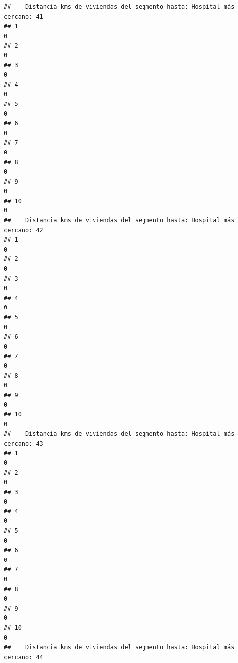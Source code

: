 \documentclass[11pt,]{article}
\begin{document}
\begin{verbatim}
##    Distancia kms de viviendas del segmento hasta: Hospital más cercano: 41
## 1                                                                        0
## 2                                                                        0
## 3                                                                        0
## 4                                                                        0
## 5                                                                        0
## 6                                                                        0
## 7                                                                        0
## 8                                                                        0
## 9                                                                        0
## 10                                                                       0
##    Distancia kms de viviendas del segmento hasta: Hospital más cercano: 42
## 1                                                                        0
## 2                                                                        0
## 3                                                                        0
## 4                                                                        0
## 5                                                                        0
## 6                                                                        0
## 7                                                                        0
## 8                                                                        0
## 9                                                                        0
## 10                                                                       0
##    Distancia kms de viviendas del segmento hasta: Hospital más cercano: 43
## 1                                                                        0
## 2                                                                        0
## 3                                                                        0
## 4                                                                        0
## 5                                                                        0
## 6                                                                        0
## 7                                                                        0
## 8                                                                        0
## 9                                                                        0
## 10                                                                       0
##    Distancia kms de viviendas del segmento hasta: Hospital más cercano: 44

\end{verbatim}
\end{document}
